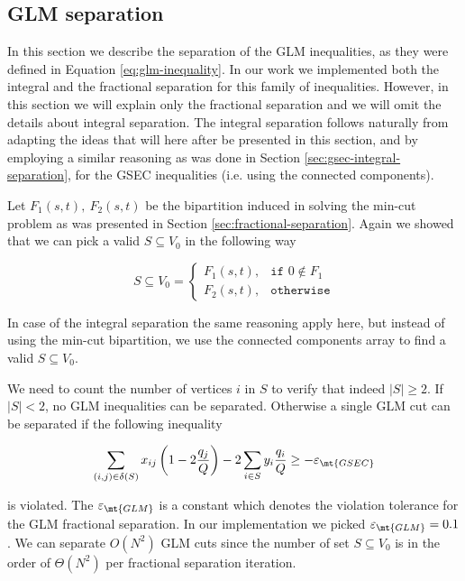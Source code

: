 \subsection{GLM separation}\label{sec:glm-separation}
In this section we describe the separation of the GLM inequalities, as they were defined in Equation \eqref{eq:glm-inequality}.
In our work we implemented both the integral and the fractional separation for this family of inequalities.
However, in this section we will explain only the fractional separation and we will omit the details about integral separation.
The integral separation follows naturally from adapting the ideas that will here after be presented in this section, and by employing a similar reasoning as was done in Section \ref{sec:gsec-integral-separation}, for the GSEC inequalities (i.e. using the connected components).

Let $F_1(s, t),\ F_2(s, t)$ be the bipartition induced in solving the min-cut problem as was presented in Section \ref{sec:fractional-separation}.
Again we showed that we can pick a valid $S \subseteq V_0$ in the following way

\begin{equation}
	S \subseteq V_0 =
	\begin{cases}
		F_1(s, t), & \texttt{if } 0 \notin F_1 \\
		F_2(s, t), & \texttt{otherwise}
	\end{cases}
\end{equation}

In case of the integral separation the same reasoning apply here, but instead of using the min-cut bipartition, we use the connected components array to find a valid $S \subseteq V_0$.

We need to count the number of vertices $i$ in $S$ to verify that indeed $|S| \ge 2$.
If $|S| < 2$, no GLM inequalities can be separated.
Otherwise a single GLM cut can be separated if the following inequality

\begin{equation}
	\begin{split}
		\sum_{(i, j) \in \delta(S)} x_{ij} \left( 1 - 2 \frac{q_j}{Q} \right)  -2 \sum_{i \in S} y_i \frac{q_i}{Q}  \ge  - \varepsilon_{\mt{GSEC}}
	\end{split}
\end{equation}

is violated.
The $\varepsilon_{\mt{GLM}}$ is a constant which denotes the violation tolerance for the GLM fractional separation.
In our implementation we picked $\varepsilon_{\mt{GLM}} = 0.1$.
We can separate $O(N^2)$ GLM cuts since the number of set $S \subseteq V_0$ is in the order of $\Theta(N^2)$ per fractional separation iteration.


